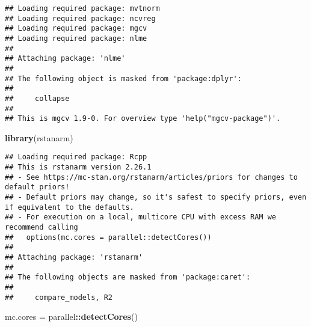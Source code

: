\documentclass[
]{article}
\newenvironment{Shaded}{\begin{snugshade}}{\end{snugshade}}
\newcommand{\FunctionTok}[1]{\textcolor[rgb]{0.13,0.29,0.53}{\textbf{#1}}}
\newcommand{\NormalTok}[1]{#1}
\newcommand{\OtherTok}[1]{\textcolor[rgb]{0.56,0.35,0.01}{#1}}
\newcommand{\SpecialCharTok}[1]{\textcolor[rgb]{0.81,0.36,0.00}{\textbf{#1}}}
\begin{document}
\begin{verbatim}
## Loading required package: mvtnorm
## Loading required package: ncvreg
## Loading required package: mgcv
## Loading required package: nlme
## 
## Attaching package: 'nlme'
## 
## The following object is masked from 'package:dplyr':
## 
##     collapse
## 
## This is mgcv 1.9-0. For overview type 'help("mgcv-package")'.
\end{verbatim}

\begin{Shaded}
\begin{Highlighting}[]
\FunctionTok{library}\NormalTok{(rstanarm)}
\end{Highlighting}
\end{Shaded}

\begin{verbatim}
## Loading required package: Rcpp
## This is rstanarm version 2.26.1
## - See https://mc-stan.org/rstanarm/articles/priors for changes to default priors!
## - Default priors may change, so it's safest to specify priors, even if equivalent to the defaults.
## - For execution on a local, multicore CPU with excess RAM we recommend calling
##   options(mc.cores = parallel::detectCores())
## 
## Attaching package: 'rstanarm'
## 
## The following objects are masked from 'package:caret':
## 
##     compare_models, R2
\end{verbatim}

\begin{Shaded}
\begin{Highlighting}[]
\NormalTok{mc.cores }\OtherTok{=}\NormalTok{ parallel}\SpecialCharTok{::}\FunctionTok{detectCores}\NormalTok{()}
\end{Highlighting}
\end{Shaded}
\end{document}
